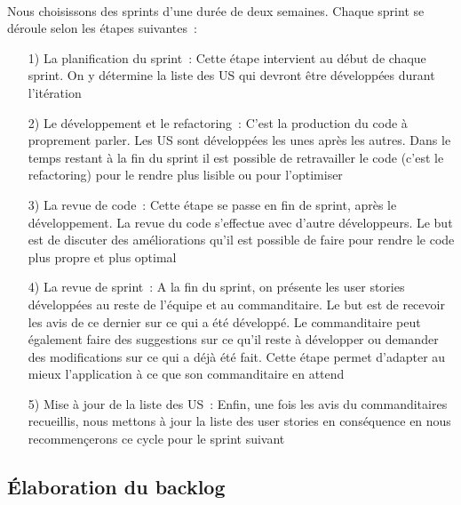 			\paragraph{}%
			Nous choisissons des sprints d'une durée de deux semaines. Chaque sprint se
			déroule selon les étapes suivantes~:
			\begin{itemize}
			  \item[1) La planification du sprint~:] Cette étape intervient au début de
			  chaque sprint. On y détermine la liste des US qui devront être
			  développées durant l'itération
			  \item[2) Le développement et le refactoring~:] C'est la production du code
			  à proprement parler. Les US sont développées les unes après les
			  autres. Dans le temps restant à la fin du sprint il est possible de
			  retravailler le code (c'est le refactoring) pour le rendre plus lisible ou
			  pour l'optimiser
			  \item[3) La revue de code~:] Cette étape se passe en fin de sprint, après
			  le développement. La revue du code s'effectue avec d'autre développeurs. Le
			  but est de discuter des améliorations qu'il est possible de faire pour
			  rendre le code plus propre et plus optimal
			  \item[4) La revue de sprint~:] A la fin du sprint, on présente les user
			  stories développées au reste de l'équipe et au commanditaire. Le but est de
			  recevoir les avis de ce dernier sur ce qui a été développé. Le
			  commanditaire peut également faire des suggestions sur ce qu'il reste à
			  développer ou demander des modifications sur ce qui a déjà été fait. Cette
			  étape permet d'adapter au mieux l'application à ce que son commanditaire en
			  attend
			  \item[5) Mise à jour de la liste des US~:] Enfin, une fois les
			  avis du commanditaires recueillis, nous mettons à jour la liste des user
			  stories en conséquence en nous recommençerons ce cycle pour le sprint
			  suivant
			\end{itemize}
		
		\subsection{Élaboration du backlog}
